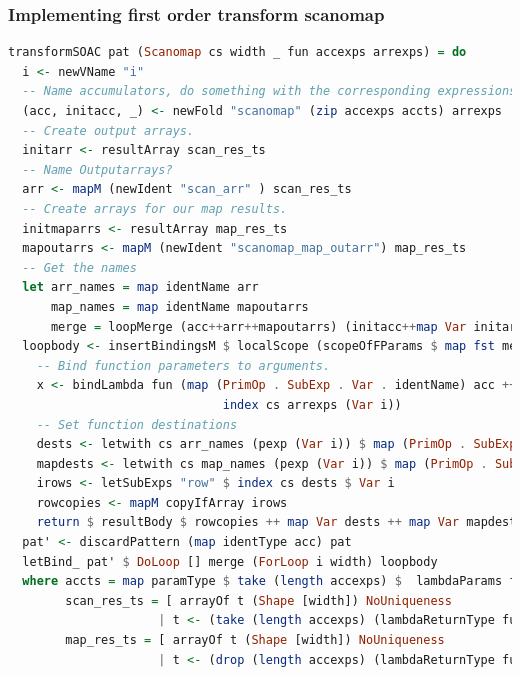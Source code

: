 \documentclass[11pt,bibliography=totocnumbered]{article}
\begin{document}
\subsubsection{Implementing first order transform scanomap}
\begin{lstlisting}[language=Haskell,caption=Scanomap first order transform] 
transformSOAC pat (Scanomap cs width _ fun accexps arrexps) = do
  i <- newVName "i"
  -- Name accumulators, do something with the corresponding expressions
  (acc, initacc, _) <- newFold "scanomap" (zip accexps accts) arrexps
  -- Create output arrays.
  initarr <- resultArray scan_res_ts
  -- Name Outputarrays?
  arr <- mapM (newIdent "scan_arr" ) scan_res_ts
  -- Create arrays for our map results.
  initmaparrs <- resultArray map_res_ts
  mapoutarrs <- mapM (newIdent "scanomap_map_outarr") map_res_ts
  -- Get the names
  let arr_names = map identName arr
      map_names = map identName mapoutarrs
      merge = loopMerge (acc++arr++mapoutarrs) (initacc++map Var initarr ++ map Var initmaparrs)
  loopbody <- insertBindingsM $ localScope (scopeOfFParams $ map fst merge) $ do
    -- Bind function parameters to arguments.
    x <- bindLambda fun (map (PrimOp . SubExp . Var . identName) acc ++
                              index cs arrexps (Var i))
    -- Set function destinations
    dests <- letwith cs arr_names (pexp (Var i)) $ map (PrimOp . SubExp) (take (length accexps) x)
    mapdests <- letwith cs map_names (pexp (Var i)) $ map (PrimOp . SubExp) (drop (length accexps) x)
    irows <- letSubExps "row" $ index cs dests $ Var i
    rowcopies <- mapM copyIfArray irows
    return $ resultBody $ rowcopies ++ map Var dests ++ map Var mapdests
  pat' <- discardPattern (map identType acc) pat
  letBind_ pat' $ DoLoop [] merge (ForLoop i width) loopbody
  where accts = map paramType $ take (length accexps) $  lambdaParams fun
        scan_res_ts = [ arrayOf t (Shape [width]) NoUniqueness
                     | t <- (take (length accexps) (lambdaReturnType fun))]
        map_res_ts = [ arrayOf t (Shape [width]) NoUniqueness
                     | t <- (drop (length accexps) (lambdaReturnType fun))]
\end{lstlisting}
\end{document}
